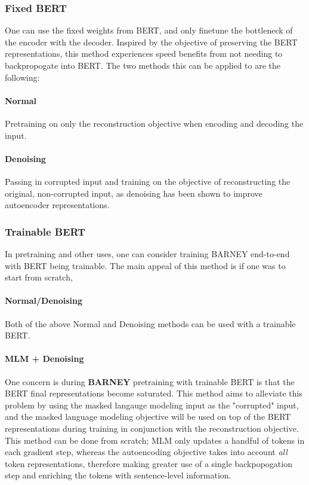 \subsubsection{Fixed BERT}
One can use the fixed weights from BERT, and only finetune the bottleneck of the encoder with the decoder. Inspired by the objective of preserving the BERT representations, this method experiences speed benefits from not needing to backpropogate into BERT. The two methods this can be applied to are the following:

\paragraph{Normal}
Pretraining on only the reconstruction objective when encoding and decoding the input.

\paragraph{Denoising}
Passing in corrupted input and training on the objective of reconstructing the original, non-corrupted input, as denoising has been shown to improve autoencoder representations. \citep{vincent2008denoising}


\subsubsection{Trainable BERT}
In pretraining and other uses, one can consider training BARNEY end-to-end with BERT being trainable. The main appeal of this method is if one was to start from scratch, 

\paragraph{Normal/Denoising}
Both of the above Normal and Denoising methods can be used with a trainable BERT.

\paragraph{MLM + Denoising}
One concern is during \textbf{BARNEY} pretraining with trainable BERT is that the BERT final representations become saturated. This method aims to alleviate this problem by using the masked langauge modeling input as the "corrupted" input, and the masked language modeling objective will be used on top of the BERT representations during training in conjunction with the reconstruction objective. This method can be done from scratch; MLM only updates a handful of tokens in each gradient step, whereas the autoencoding objective takes into account \textit{all} token representations, therefore making greater use of a single backpopogation step and enriching the tokens with sentence-level information.

